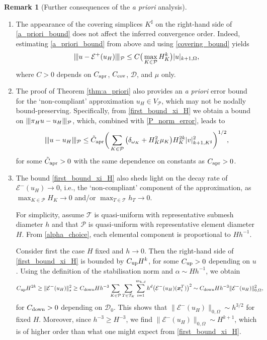\documentclass[11pt,final]{amsart}
\theoremstyle{plain}
\theoremstyle{definition}
\newtheorem{Remark}[theorem]{Remark}
\newcommand\bx{\boldsymbol{x}}
\newcommand\calP{{\mathcal{P}}}
\newcommand\calT{{\mathcal{T}}}
\newcommand{\mesh}{\calP}
\newcommand{\ndgp}[1]{| \kern -.25mm \|{#1}| \kern -.25mm \|_{\rm \mesh}}
\newcommand{\norm}[2]{\|{#1}\|_{{#2}}}
\renewcommand{\k}{K}
\newcommand{\ksh}{{K^{\sharp}}}
\begin{document}
\begin{Remark}[Further consequences of the \emph{a priori} analysis]
  \phantom{Some remarks}
  \begin{enumerate}
  \item The appearance of the covering simplices $\ksh$ on the
    right-hand side of \eqref{a_priori_bound} does not affect the
    inferred convergence order. Indeed, estimating
    \eqref{a_priori_bound} from above and using \eqref{covering_bound}
    yields
    \[
    \ndgp{u-\mathcal{E}^+(u_H)}\le  C \big(\max_{\k\in\mesh} H_\k^k\big) |u|_{k+1,\Omega},
    \]
    where $C>0$ depends on $C_{\rm apr}$, $C_{\rm cov}$,
    $\mathcal{D}$, and $\mu$ only.
    
  \item The proof of Theorem \ref{thm:a_priori} also provides an
    \emph{a priori} error bound for the `non-compliant' approximation
    $u_H\in V_\mesh$, which may not be nodally
    bound-preserving. Specifically, from \eqref{first_bound_xi_H} we
    obtain a bound on $\ndgp{\pi_Hu-u_H}$, which, combined with
    \eqref{P_norm_error}, leads to
    \[
    \ndgp{u-u_H}\le  \tilde{C}_{\rm apr}\bigg(\sum_{\k\in\mesh}\big(\delta_{\omega_\k}+ H_\k^2\mu_\k\big)
    H_{\k}^{2k} |v|_{k+1,\ksh}^2\bigg)^{1/2},
    \] 
    for some $\tilde{C}_{\rm apr}>0$ with the same dependence on
    constants as $C_{\rm apr}>0$.
    
  \item The bound \eqref{first_bound_xi_H} also sheds light on the
    decay rate of $\mathcal{E}^-(u_H)\to 0$, i.e., the `non-compliant'
    component of the approximation, as $\max_{\k\in\mesh}H_\k\to 0$
    and/or $\max_{T\in\calT}h_T\to 0$.
    
    For simplicity, assume $\calT$ is quasi-uniform with
    representative submesh diameter $h$ and that $\mesh$ is
    quasi-uniform with representative element diameter $H$. From
    \eqref{alpha_choice}, each elemental component is proportional to
    $H h^{-1}$.
		
    Consider first the case $H$ fixed and $h\to 0$. Then the
    right-hand side of \eqref{first_bound_xi_H} is bounded by $C_{\rm
      up}H^k$, for some $C_{\rm up}>0$ depending on $u$. Using the
    definition of the stabilisation norm and $\alpha\sim H h^{-1}$, we
    obtain
    \[
    \begin{aligned}
      C_{\rm up}H^{2k}\ge \norm{\mathcal{E}^-(u_H)}{s}^2\ge&\ C_{\rm down}H h^{-3}\sum_{\k\in\mesh}\sum_{T\in\calT_\k}\sum_{i=1}^{m_{k,d}} h^{d}\big(\mathcal{E}^-(u_H)(\bx_i^T)\big)^2\sim C_{\rm down}H h^{-3} \|\mathcal{E}^-(u_H)\|_{0,\Omega}^2,
    \end{aligned}
    \]
    for $C_{\rm down}>0$ depending on $\mathcal{D}_0$. This shows that
    $\|\mathcal{E}^-(u_H)\|_{0,\Omega}\sim h^{3/2}$ for fixed
    $H$. Moreover, since $h^{-3}\ge H^{-3}$, we find
    $\|\mathcal{E}^-(u_H)\|_{0,\Omega}\sim H^{k+1}$, which is of
    higher order than what one might expect from
    \eqref{first_bound_xi_H}.
  \end{enumerate}
\end{Remark}
\end{document}
